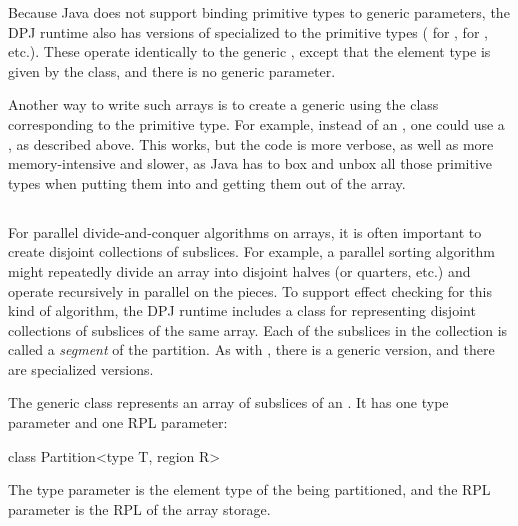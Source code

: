  Because Java does not support
binding primitive types to generic parameters, the DPJ runtime also
has versions of  specialized to the primitive types
( for ,  for ,
etc.).  These operate identically to the generic ,
except that the element type is given by the class, and there is no
generic parameter.

Another way to write such arrays is to create a generic 
using the class corresponding to the primitive type.  For example,
instead of an , one could use a
, as described above.  This works, but the code
is more verbose, as well as more memory-intensive and slower, as Java
has to box and unbox all those primitive types when putting them into
and getting them out of the array.


\subsection{%
\label{sec:runtime:partition}}

For parallel divide-and-conquer algorithms on arrays, it is often
important to create disjoint collections of subslices.  For example, a
parallel sorting algorithm might repeatedly divide an array into
disjoint halves (or quarters, etc.) and operate recursively in
parallel on the pieces.  To support effect checking for this kind of
algorithm, the DPJ runtime includes a class  for
representing disjoint collections of subslices of the same array.
Each of the subslices in the collection is called a \emph{segment} of
the partition.  As with , there is a generic version,
and there are specialized versions.

  The generic 
class represents an array of subslices of an .  It has
one type parameter and one RPL parameter:
%
\begin{dpjlisting}
class Partition<type T, region R>
\end{dpjlisting}
%
The type parameter is the element type of the  being
partitioned, and the RPL parameter is the RPL of the array storage.

